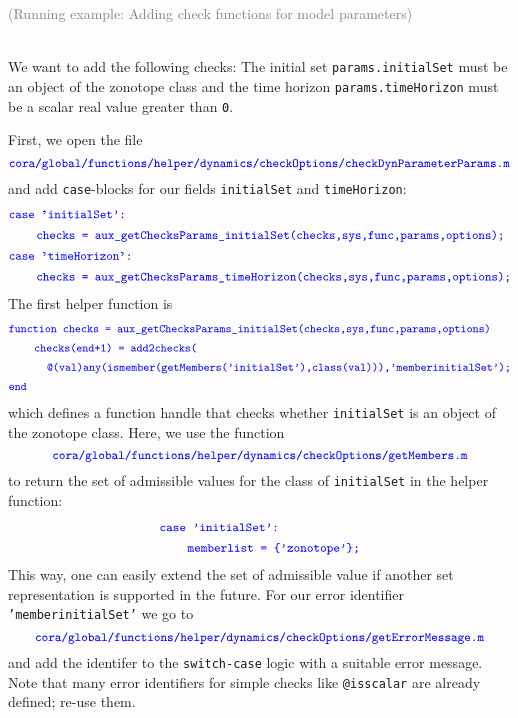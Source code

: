 \begin{tcolorbox}
	\begin{scriptsize} \textcolor{gray}{(Running example: Adding check functions for model parameters)} \end{scriptsize} \\
	We want to add the following checks:
	The initial set \texttt{params.initialSet} must be an object of the zonotope class and the time horizon \texttt{params.timeHorizon} must be a scalar real value greater than \texttt{0}.

	First, we open the file
	\begin{equation*}
		\textcolor{blue}{\small{\texttt{cora/global/functions/helper/dynamics/checkOptions/checkDynParameterParams.m}}}
	\end{equation*}
	and add \texttt{case}-blocks for our fields \texttt{initialSet} and \texttt{timeHorizon}:
	\begin{align*}
		&		\textcolor{blue}{\small{\texttt{case 'initialSet':}}} \\
		&\qquad \textcolor{blue}{\small{\texttt{checks = aux\_getChecksParams\_initialSet(checks,sys,func,params,options);}}} \\
		&		\textcolor{blue}{\small{\texttt{case 'timeHorizon':}}} \\
		&\qquad \textcolor{blue}{\small{\texttt{checks = aux\_getChecksParams\_timeHorizon(checks,sys,func,params,options);}}}
	\end{align*}
	The first helper function is
	\begin{align*}
		&		\textcolor{blue}{\small{\texttt{function checks = aux\_getChecksParams\_initialSet(checks,sys,func,params,options)}}} \\
    	&\qquad \textcolor{blue}{\small{\texttt{checks(end+1) = add2checks(}}} \\
		&\qquad \quad \textcolor{blue}{\small{\texttt{@(val)any(ismember(getMembers('initialSet'),class(val))),'memberinitialSet');}}} \\
		&		\textcolor{blue}{\small{\texttt{end}}}
	\end{align*}
	which defines a function handle that checks whether \texttt{initialSet} is an object of the zonotope class.
	Here, we use the function
	\begin{equation*}
		\textcolor{blue}{\small{\texttt{cora/global/functions/helper/dynamics/checkOptions/getMembers.m}}}
	\end{equation*}
	to return the set of admissible values for the class of \texttt{initialSet} in the helper function:
	\begin{align*}
		&		\textcolor{blue}{\small{\texttt{case 'initialSet':}}} \\
		&\qquad \textcolor{blue}{\small{\texttt{memberlist = \{'zonotope'\};}}}
	\end{align*}
	This way, one can easily extend the set of admissible value if another set representation is supported in the future.
	For our error identifier \texttt{'memberinitialSet'} we go to
	\begin{equation*}
		\textcolor{blue}{\small{\texttt{cora/global/functions/helper/dynamics/checkOptions/getErrorMessage.m}}}
	\end{equation*}
	and add the identifer to the \texttt{switch-case} logic with a suitable error message.
	Note that many error identifiers for simple checks like \texttt{@isscalar} are already defined; re-use them.


\end{tcolorbox}
